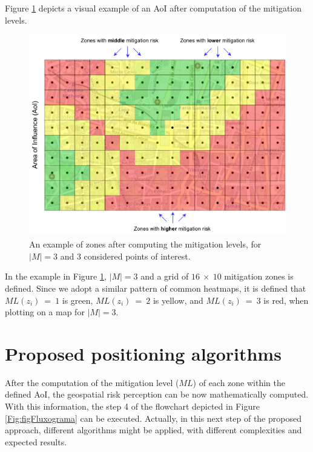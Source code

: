 \begin{refsection}
Figure \ref{Fig:figGrid2} depicts a visual example of an AoI after computation of the mitigation levels. 


\begin{figure}[htbp!]
    \centering
    \includegraphics[width=0.77\linewidth]{Chapters/2-EDUs/images/MitigationZonesColors.pdf}
    \caption{An example of zones after computing the mitigation levels, for $|M|=3$ and 3 considered points of interest.}
    \label{Fig:figGrid2}
\end{figure}

In the example in Figure \ref{Fig:figGrid2}, $|M|=3$ and a grid of $16~\times~10$ mitigation zones is defined. Since we adopt a similar pattern of common heatmaps, it is defined that $ML(z_i)~=~1$ is green, $ML(z_i)~=~2$ is yellow, and $ML(z_i)~=~3$ is red, when plotting on a map for $|M|=3$.


\section{Proposed positioning algorithms}
\label{S:4}

After the computation of the mitigation level ($ML$) of each zone within the defined AoI, the geospatial risk perception can be now mathematically computed. With this information, the step 4 of the flowchart depicted in Figure \ref{Fig:figFluxograma} can be executed. Actually, in this next step of the proposed approach, different algorithms might be applied, with different complexities and expected results. 


\end{refsection}
